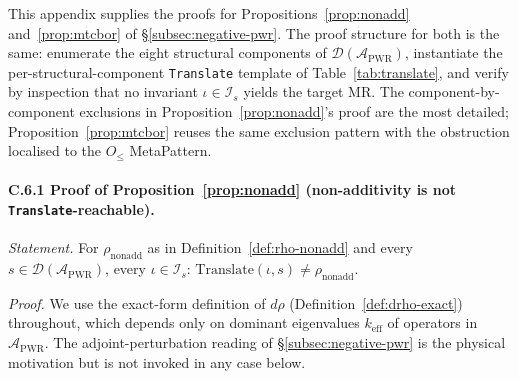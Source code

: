 \documentclass[acmsmall,screen,review]{acmart}
\begin{document}
This appendix supplies the proofs for Propositions~\ref{prop:nonadd} and~\ref{prop:mtcbor} of \S\ref{subsec:negative-pwr}. The proof structure for both is the same: enumerate the eight structural components of $\mathcal{D}(\mathcal{A}_{\mathrm{PWR}})$, instantiate the per-structural-component \texttt{Translate} template of Table~\ref{tab:translate}, and verify by inspection that no invariant $\iota \in \mathcal{I}_{s}$ yields the target MR. The component-by-component exclusions in Proposition~\ref{prop:nonadd}'s proof are the most detailed; Proposition~\ref{prop:mtcbor} reuses the same exclusion pattern with the obstruction localised to the $O_{\le}$ MetaPattern.

\paragraph{C.6.1 Proof of Proposition~\ref{prop:nonadd} (non-additivity is not \texttt{Translate}-reachable).}

\emph{Statement.} For $\rho_{\mathrm{nonadd}}$ as in Definition~\ref{def:rho-nonadd} and every $s \in \mathcal{D}(\mathcal{A}_{\mathrm{PWR}})$, every $\iota \in \mathcal{I}_{s}$: $\mathrm{Translate}(\iota, s) \neq \rho_{\mathrm{nonadd}}$.

\emph{Proof.} We use the exact-form definition of $d\rho$ (Definition~\ref{def:drho-exact}) throughout, which depends only on dominant eigenvalues $k_{\mathrm{eff}}$ of operators in $\mathcal{A}_{\mathrm{PWR}}$. The adjoint-perturbation reading of \S\ref{subsec:negative-pwr} is the physical motivation but is not invoked in any case below.
\end{document}
